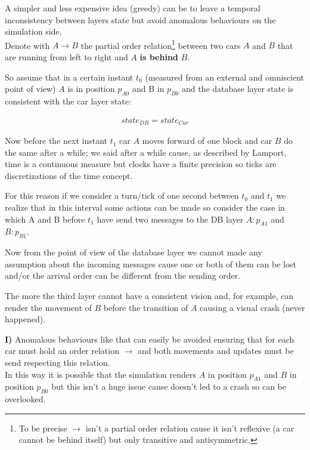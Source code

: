 A simpler and less expensive idea (greedy) can be to leave a temporal inconsistency between 
layers state but avoid anomalous behaviours on the simulation side. \\

\noindent
Denote with $A \rightarrow B$ the partial order relation\footnote{
    To be precise $\rightarrow$ isn't a partial order relation cause it isn't 
    reflexive (a car cannot be behind itself) but only transitive and antisymmetric.
} between two cars $A$ and $B$ that are running from left to right and $A$ 
\textbf{is behind} $B$. 

So assume that in a certain instant $t_0$ 
(measured from an external and omniscient point of view) 
$A$ is in position $p_{A0}$ and B in $p_{B0}$ and 
the database layer state is consistent with the car layer state:

\begin{equation}\begin{split}
    state_{DB} = state_{Car}
\end{split}\end{equation} 

\noindent
Now before the next instant $t_1$ car $A$ moves forward of one block and car $B$
do the same after a while; we said after a while cause, as described by Lamport,
time is a continuous measure but clocks have a finite precision so 
ticks are discretizations of the time concept. 

For this reason if we consider a turn/tick 
of one second between $t_0$ and $t_1$ we realize that in this interval some 
actions can be made so consider the case in which A and B before $t_1$ 
have send two messages to the DB layer $A:p_{A1}$ and $B:p_{B1}$.

Now from the point of view of the database layer we cannot made any assumption 
about the incoming messages cause one or both of them can be lost and/or the 
arrival order can be different from the sending order. 

The more the third layer cannot have a consistent vision and, for example, 
can render the movement of $B$ before the transition of $A$ causing 
a visual crash (never happened).\\

\begin{tcolorbox}
\textbf{I)} Anomalous behaviours like that can easily be avoided ensuring that 
for each car must hold an order relation $\rightarrow$ and both movements 
and updates must be send respecting this relation.\\

In this way it is possible 
that the simulation renders $A$ in position $p_{A1}$ and $B$ in position 
$p_{B0}$ but this isn't a huge issue cause doesn't led to a crash so 
can be overlooked.
\end{tcolorbox}

